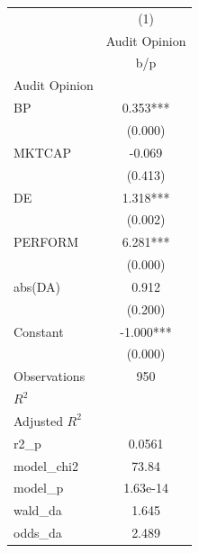 {
\def\sym#1{\ifmmode^{#1}\else\(^{#1}\)\fi}
\begin{tabular}{l*{1}{c}}
\hline\hline
                    &\multicolumn{1}{c}{(1)}\\
                    &\multicolumn{1}{c}{Audit Opinion}\\
                    &         b/p   \\
\hline
Audit Opinion       &               \\
BP                  &       0.353***\\
                    &     (0.000)   \\
MKTCAP              &      -0.069   \\
                    &     (0.413)   \\
DE                  &       1.318***\\
                    &     (0.002)   \\
PERFORM             &       6.281***\\
                    &     (0.000)   \\
abs(DA)             &       0.912   \\
                    &     (0.200)   \\
Constant            &      -1.000***\\
                    &     (0.000)   \\
\hline
Observations        &         950   \\
\(R^{2}\)           &               \\
Adjusted \(R^{2}\)  &               \\
r2\_p                &      0.0561   \\
model\_chi2          &       73.84   \\
model\_p             &    1.63e-14   \\
wald\_da             &       1.645   \\
odds\_da             &       2.489   \\
\hline\hline
\end{tabular}
}
